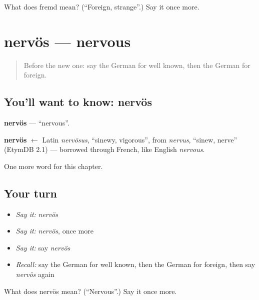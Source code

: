 \begin{tcolorbox}[breakable,colback=teal!4,colframe=teal!35!black,title={Before you move on}]
What does fremd mean? (\textquotedblleft{}Foreign, strange\textquotedblright{}.) Say it once more.
\end{tcolorbox}
\section[nervös]{nervös — nervous}

\label{lesson:GE-C169-nervoes}



\begin{quote}
Before the new one: say the German for well known, then the German for foreign.
\end{quote}

\subsection*{You'll want to know: nervös}
\textbf{nervös} — \textquotedblleft{}nervous\textquotedblright{}.

\begin{cousinweb}
\textbf{nervös} $\leftarrow$ Latin \emph{nervōsus}, \textquotedblleft{}sinewy, vigorous\textquotedblright{}, from \emph{nervus}, \textquotedblleft{}sinew, nerve\textquotedblright{} (EtymDB 2.1) — borrowed through French, like English \emph{nervous}.
\end{cousinweb}

\begin{grammarlens}[title={What you've built}]
One more word for this chapter.
\end{grammarlens}

\subsection*{Your turn}
\begin{itemize}
\raggedright
  \item \emph{Say it:} \emph{nervös}
  \item \emph{Say it:} \emph{nervös}, once more
  \item \emph{Say it:} say \emph{nervös}
  \item \emph{Recall:} say the German for well known, then the German for foreign, then say \emph{nervös} again
\end{itemize}

\begin{tcolorbox}[breakable,colback=teal!4,colframe=teal!35!black,title={Before you move on}]
What does nervös mean? (\textquotedblleft{}Nervous\textquotedblright{}.) Say it once more.
\end{tcolorbox}
